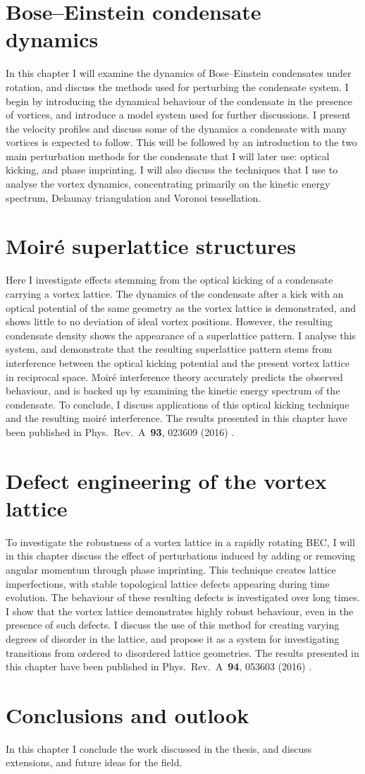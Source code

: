\section*{Bose--Einstein condensate dynamics}
In this chapter I will examine the dynamics of Bose--Einstein condensates under rotation, and discuss the methods used for perturbing the condensate system. I begin by introducing the dynamical behaviour of the condensate in the presence of vortices, and introduce a model system used for further discussions. I present the velocity profiles and discuss some of the dynamics a condensate with many vortices is expected to follow. This will be followed by an introduction to the two main perturbation methods for the condensate that I will later use: optical kicking, and phase imprinting. I will also discuss the techniques that I use to analyse the vortex dynamics, concentrating primarily on the kinetic energy spectrum, Delaunay triangulation and Voronoi tessellation.

\section*{Moir\'e superlattice structures}
Here I investigate effects stemming from the optical kicking of a condensate carrying a vortex lattice. The dynamics of the condensate after a kick with an optical potential of the same geometry as the vortex lattice is demonstrated, and shows little to no deviation of ideal vortex positions. However, the resulting condensate density shows the appearance of a superlattice pattern. I analyse this system, and demonstrate that the resulting superlattice pattern stems from interference between the optical kicking potential and the present vortex lattice in reciprocal space. Moir\'e interference theory accurately predicts the observed behaviour, and is backed up by examining the kinetic energy spectrum of the condensate. To conclude, I discuss applications of this optical kicking technique and the resulting moir\'e interference. The results presented in this chapter have been published in Phys.~Rev.~A~\textbf{93}, 023609 (2016) \cite{VTX:oriordan_pra_2016}.

\section*{Defect engineering of the vortex lattice}
To investigate the robustness of a vortex lattice in a rapidly rotating BEC, I will in this chapter discuss the effect of perturbations induced by adding or removing angular momentum through phase imprinting. This technique creates lattice imperfections, with stable topological lattice defects appearing during time evolution. The behaviour of these resulting defects is investigated over long times. I show that the vortex lattice demonstrates highly robust behaviour, even in the presence of such defects. I discuss the use of this method for creating varying degrees of disorder in the lattice, and propose it as a system for investigating transitions from ordered to disordered lattice geometries. The results presented in this chapter have been published in Phys.~Rev.~A~\textbf{94}, 053603 (2016) \cite{PhysRevA.94.053603}.

\section*{Conclusions and outlook}
In this chapter I conclude the work discussed in the thesis, and discuss extensions, and future ideas for the field.
